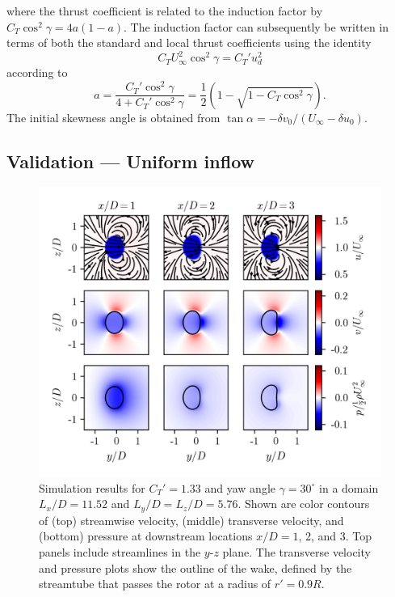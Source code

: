 %
where the thrust coefficient is related to the induction factor by $C_T \cos ^2 \gamma = 4a(1-a)$. The induction factor can subsequently be written in terms of both the standard  and local thrust coefficients using the identity 
\begin{equation}
C_T U_\infty^2 \cos^2 \gamma = C_T' u_d^2
\end{equation}
according to
%
\begin{equation}
\label{eq:induction_factor}
a = \frac{C_T' \cos^2 \gamma}{4 + C_T' \cos^2 \gamma} = \frac{1}{2} \left(1 - \sqrt{1 - C_T \cos^2 \gamma} \right).
\end{equation}
The initial skewness angle is obtained from $\tan \alpha = -\delta v_0 / (U_\infty - \delta u_0)$.

\subsection{Validation --- Uniform inflow}
\label{subsec:yaw-validation}

\begin{figure}[b!]
\begin{center}
\includegraphics[width=\textwidth]{./fig/yzplane.png}
\caption{\label{fig:yzplane} Simulation results for $C_T' = 1.33$ and yaw angle $\gamma = 30^\circ$ in a domain $L_x/D=11.52$ and   $L_y/D=L_z/D=5.76$.
Shown are color contours of (top) streamwise velocity, (middle) transverse velocity, and (bottom) pressure at downstream locations $x/D = 1$, 2, and 3. Top panels  include streamlines in the $y$-$z$ plane. The transverse velocity and pressure plots show the outline of the wake, defined by the streamtube that passes the rotor at a radius of $r'=0.9R$.}
\end{center}
\end{figure}

